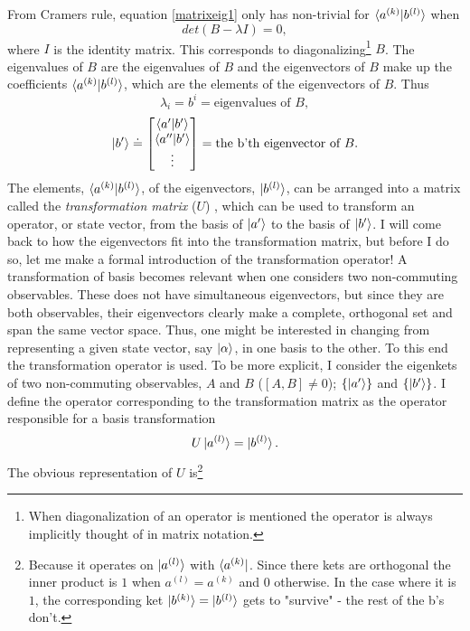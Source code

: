 From Cramers rule, equation \eqref{matrixeig1} only has non-trivial for $\braket{a^{(k)}|b^{(l)}}$ when
\begin{equation}
	det(B-\lambda I)=0,
	\label{cramer1}
\end{equation} 
where $I$ is the identity matrix. This corresponds to diagonalizing\footnote{When diagonalization of an operator is mentioned the operator is always implicitly thought of in matrix notation.} $B$. The eigenvalues of $B$ are the eigenvalues of $B$ and the eigenvectors of $B$ make up the coefficients $\braket{a^{(k)}|b^{(l)}}$, which are the elements of the eigenvectors of $B$. Thus
\begin{equation}
	\lambda_i=b^i=\mbox{eigenvalues of $B$},
\end{equation} 
\begin{equation}
	\ket{b'}\doteq\begin{bmatrix}
		\braket{a'|b'}\\
		\braket{a''|b'}\\
		\vdots\\
	\end{bmatrix}= \mbox{the b'th eigenvector of $B$}.
	\label{eigenket}
\end{equation} 
The elements, $\braket{a^{(k)}|b^{(l)}}$, of the eigenvectors, $\ket{b^{(l)}}$, can be arranged into a matrix called the \emph{transformation matrix} ($U$) , which can be used to transform an operator, or state vector, from the basis of $\ket{a'}$ to the basis of $\ket{b'}$. I will come back to how the eigenvectors fit into the transformation matrix, but before I do so, let me make a formal introduction of the transformation operator! A transformation of basis becomes relevant when one considers two non-commuting observables. These does not have simultaneous eigenvectors, but since they are both observables, their eigenvectors clearly make a complete, orthogonal set and span the same vector space. Thus, one might be interested in changing from representing a given state vector, say $\ket{\alpha}$, in one basis to the other. To this end the transformation operator is used. To be more explicit, I consider the eigenkets of two non-commuting observables, $A$ and $B$ ($[A,B]\neq0$); $\{\ket{a'}\}$ and $\{\ket{b'}\}$. I define the operator corresponding to the transformation matrix as the operator responsible for a basis transformation
\begin{equation}
	U\ket{a^{(l)}}=\ket{b^{(l)}}.
	\label{eig3}
\end{equation} 
The obvious representation of $U$ is\footnote{Because it operates on $\ket{a^{(l)}}$ with $\bra{a^{(k)}}$. Since there kets are orthogonal the inner product is $1$ when $a^{(l)}=a^{(k)}$ and $0$ otherwise. In the case where it is $1$, the corresponding ket $\ket{b^{(k)}}=\ket{b^{(l)}}$ gets to "survive" - the rest of the b's don't.}
